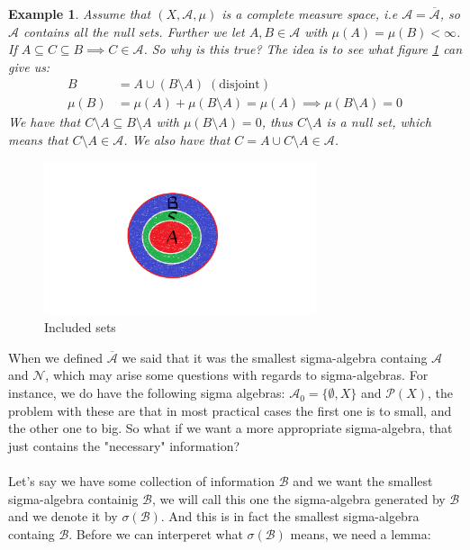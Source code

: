 \documentclass{article}
\newcommand{\A}{\mathcal{A}}
\newcommand{\Abar}{\overline{\mathcal{A}}}
\newcommand{\Null}{\mathcal{N}}
\newcommand{\B}{\mathcal{B}}
\newtheorem{ex}{Example}
\begin{document}
\begin{ex}
Assume that $(X,\A, \mu)$ is a complete measure space, i.e $\A = \Abar$, so $\A$ contains all the null sets. Further we let $A,B\in \A$ with $\mu(A) = \mu(B) < \infty$. If $A\subseteq C \subseteq B \implies C\in \A$. So why is this true? The idea is to see what figure \ref{fig:subsets} can give us: 
\begin{align*}
B &= A\cup (B\setminus A)\; (\text{disjoint}) \\
\mu(B) &= \mu(A) + \mu(B\setminus A) = \mu(A) \implies \mu(B\setminus A) = 0 
\end{align*}
We have that $C\setminus A \subseteq B\setminus A$ with $\mu(B\setminus A) = 0$, thus $C\setminus A$ is a null set, which means that $C\setminus A \in \A$. We also have that $C = A\cup C\setminus A \in \A$. 
\end{ex}

\begin{figure}[h]
\includegraphics[width=8cm]{sets_complete_measures.png}
\centering
\caption{Included sets}
\label{fig:subsets}
\end{figure}




When we defined $\Abar$ we said that it was the smallest sigma-algebra containg $\A$ and $\Null$, which may arise some questions with regards to sigma-algebras. For instance, we do have the following sigma algebras: $\A_{0} = \{\emptyset, X\}$ and $\mathcal{P}(X)$, the problem with these are that in most practical cases the first one is to small, and the other one to big. So what if we want a more appropriate sigma-algebra, that just contains the "necessary" information?
\\~\\
Let's say we have some collection of information $\B$ and we want the smallest sigma-algebra containig $\B$, we will call this one the sigma-algebra generated by $\B$ and we denote it by $\sigma(\B)$. And this is in fact the smallest sigma-algebra containg $\B$. Before we can interperet what $\sigma(\B)$ means, we need a lemma:
\end{document}
